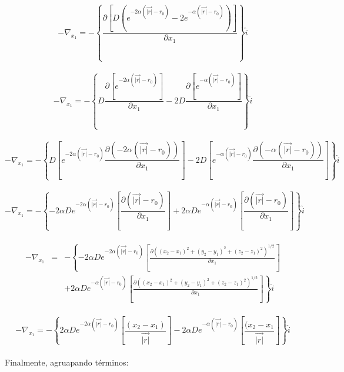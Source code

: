 \documentclass[8pt]{article}
\begin{document}
\begin{equation}
-\nabla_{x_1} = - \left\{ \frac{\partial \left[D \left(e^{-2\alpha(\vec{|r|}-r_0)} - 2e^{-\alpha(\vec{|r|}-r_0)} \right) \right]}{ \partial x_1} \right\} \hat{\textit{i}}
\end{equation}
\\
\begin{equation}
-\nabla_{x_1} = - \left\{   D \frac{\partial \left[e^{-2\alpha(\vec{|r|}-r_0) }\right]}{\partial x_1} 
                          -2D \frac{\partial \left[e^{- \alpha(\vec{|r|}-r_0) }\right]}{\partial x_1} 
                    \right\} \hat{\textit{i}}
\end{equation}
\\
\begin{equation}
-\nabla_{x_1} = - \left\{ D \left[e^{-2\alpha(\vec{|r|}-r_0)} \frac{\partial \left(-2\alpha(\vec{|r|}-r_0) \right)}{\partial x_1} \right] -2D \left[e^{-\alpha(\vec{|r|}-r_0)} \frac{\partial \left(-\alpha(\vec{|r|}-r_0) \right)}{\partial x_1} \right] \right\}\hat{\textit{i}}
\end{equation}
\\
\begin{equation}
-\nabla_{x_1} = - \left\{ -2\alpha De^{-2\alpha(\vec{|r|}-r_0)} \left[\frac{\partial(\vec{|r|}-r_0)}{\partial x_1} \right] +2\alpha De^{-\alpha(\vec{|r|}-r_0)} \left[\frac{\partial(\vec{|r|}-r_0)}{\partial x_1} \right] \right\} \hat{\textit{i}}
\end{equation}
\\
\begin{eqnarray}
-\nabla_{x_1} &=& - \left\{ -2\alpha De^{-2\alpha(\vec{|r|}-r_0)} \left[\frac{\partial \left((x_2-x_1)^2 + (y_2-y_1)^2 + (z_2-z_1)^2 \right)^{1/2}}{\partial x_1} \right] \right. \nonumber\\
&& \left. +2\alpha De^{-\alpha(\vec{|r|}-r_0)} \left[\frac{\partial \left((x_2-x_1)^2 + (y_2-y_1)^2 + (z_2-z_1)^2 \right)^{1/2}}{\partial x_1} \right] \right\} \hat{\textit{i}}
\end{eqnarray}
\\
\begin{equation}
-\nabla_{x_1} = - \left\{ 2\alpha De^{-2\alpha(\vec{|r|}-r_0)} \left[\frac{(x_2-x_1)}{\vec{|r|}} \right] - 2\alpha De^{-\alpha(\vec{|r|}-r_0)} \left[\frac{(x_2-x_1}{\vec{|r|}} \right] \right\} \hat{\textit{i}}
\end{equation}
\\

Finalmente, agruapando términos:
\end{document}
